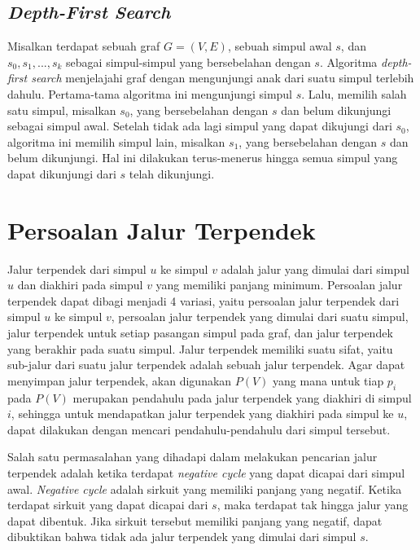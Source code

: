   \medskip
  

  \subsection{\textit{Depth-First Search}} Misalkan terdapat sebuah graf $G = (V, E)$, sebuah simpul
  awal $s$, dan $s_{0}, s_{1}, ..., s_{k}$ sebagai simpul-simpul yang bersebelahan dengan $s$.
  Algoritma \textit{depth-first search} menjelajahi graf dengan mengunjungi anak dari suatu simpul
  terlebih dahulu. Pertama-tama algoritma ini mengunjungi simpul $s$. Lalu, memilih salah satu
  simpul, misalkan $s_{0}$, yang bersebelahan dengan $s$ dan belum dikunjungi sebagai simpul awal.
  Setelah tidak ada lagi simpul yang dapat dikujungi dari $s_{0}$, algoritma ini memilih simpul
  lain, misalkan $s_{1}$, yang bersebelahan dengan $s$ dan belum dikunjungi. Hal ini dilakukan
  terus-menerus hingga semua simpul yang dapat dikunjungi dari $s$ telah dikunjungi.

  \medskip
  

\section{Persoalan Jalur Terpendek}

Jalur terpendek dari simpul $u$ ke simpul $v$ adalah jalur yang dimulai dari simpul $u$ dan diakhiri
pada simpul $v$ yang memiliki panjang minimum. Persoalan jalur terpendek dapat dibagi menjadi 4
variasi, yaitu persoalan jalur terpendek dari simpul $u$ ke simpul $v$, persoalan jalur terpendek
yang dimulai dari suatu simpul, jalur terpendek untuk setiap pasangan simpul pada graf, dan jalur
terpendek yang berakhir pada suatu simpul. Jalur terpendek memiliki suatu sifat, yaitu sub-jalur
dari suatu jalur terpendek adalah sebuah jalur terpendek. Agar dapat menyimpan jalur terpendek, akan
digunakan $P(V)$ yang mana untuk tiap $p_{i}$ pada $P(V)$ merupakan pendahulu pada jalur terpendek
yang diakhiri di simpul $i$, sehingga untuk mendapatkan jalur terpendek yang diakhiri pada simpul ke
$u$, dapat dilakukan dengan mencari pendahulu-pendahulu dari simpul tersebut.

\medskip


Salah satu permasalahan yang dihadapi dalam melakukan pencarian jalur terpendek adalah ketika
terdapat \textit{negative cycle} yang dapat dicapai dari simpul awal. \textit{Negative cycle} adalah
sirkuit yang memiliki panjang yang negatif. Ketika terdapat sirkuit yang dapat dicapai dari $s$,
maka terdapat tak hingga jalur yang dapat dibentuk. Jika sirkuit tersebut memiliki panjang yang
negatif, dapat dibuktikan bahwa tidak ada jalur terpendek yang dimulai dari simpul $s$.

